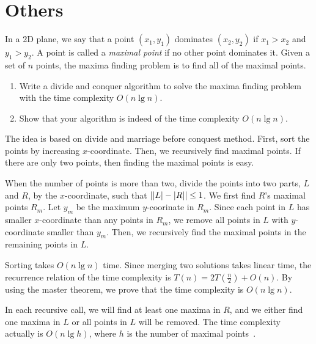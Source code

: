 \section{Others}

\begin{Exercise}[origin={NCU CSIE 98},title={Maximal points}]
In a 2D plane, we say that a point $(x_1, y_1)$ dominates $(x_2, y_2)$ if $x_1 > x_2$ and $y_1 > y_2$. A point is called a \emph{maximal point} if no other point dominates it. Given a set of $n$ points, the maxima finding problem is to find all of the maximal points.
\begin{enumerate}
\item Write a divide and conquer algorithm to solve the maxima finding problem with the time complexity $O(n \lg n)$.
\item Show that your algorithm is indeed of the time complexity $O(n \lg n)$. 
\end{enumerate}
\end{Exercise}
\begin{Answer}
The idea is based on divide and marriage before conquest method.
First, sort the points by increasing $x$-coordinate. Then, we recursively find maximal points. If there are only two points, then finding the maximal points is easy. 

When the number of points is more than two, divide the points into two parts, $L$ and $R$, by the $x$-coordinate, such that $\lvert\lvert L\rvert - \lvert R\rvert\rvert\leq 1$.
We first find $R$'s maximal points $R_m$.
Let $y_m$ be the maximum $y$-coorinate in $R_m$.
Since each point in $L$ has smaller $x$-coordinate than any points in $R_m$, we remove all points in $L$ with $y$-coordinate smaller than $y_m$.
Then, we recursively find the maximal points in the remaining points in $L$.

Sorting takes $O(n \lg n)$ time. Since merging two solutions takes linear time, the recurrence relation of the time complexity is $T(n) = 2T(\frac{n}{2}) + O(n)$. By using the master theorem, we prove that the time complexity is $O(n \lg n)$.

\begin{remark}
In each recursive call, we will find at least one maxima in $R$, and we either find one maxima in $L$ or all points in $L$ will be removed.
The time complexity actually is $O(n \lg h)$, where $h$ is the number of maximal points~\cite{Kirkpatrick1985}.
\end{remark}
\end{Answer}



\printbibliography[heading=subbibliography]
